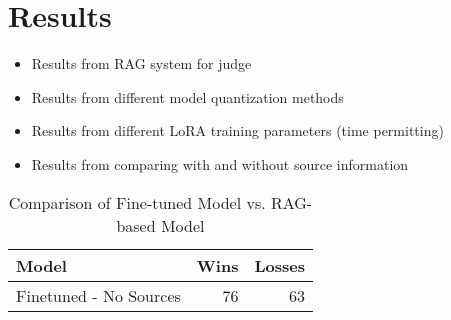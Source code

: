 \section{Results}\label{sec:results}

\begin{itemize}
    \item Results from RAG system for judge
    \item Results from different model quantization methods
    \item Results from different LoRA training parameters (time permitting)
    \item Results from comparing with and without source information
\end{itemize}

\begin{table}[h]
\centering
\caption{Comparison of Fine-tuned Model vs. RAG-based Model}
\begin{tabular}{lrr}
\hline
Model & Wins & Losses \\
\hline
Finetuned - No Sources & 76 & 63 \\
\hline
\end{tabular}
\label{tab:finetuned-vs-base}
\end{table}

